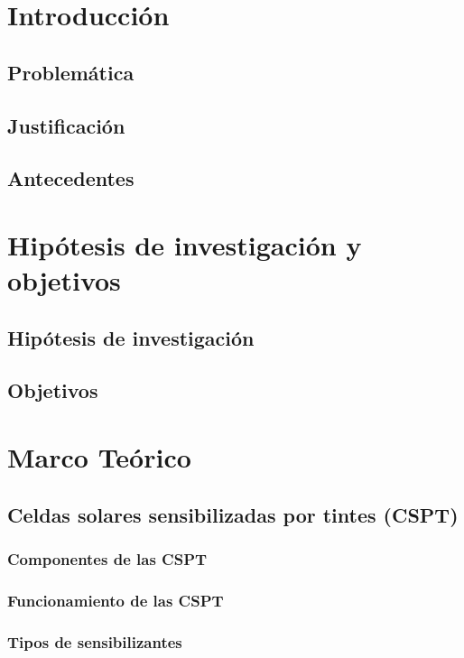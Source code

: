 \documentclass{article}
\theoremstyle{mytheoremstyle}
\theoremstyle{mytheoremstyle}
\theoremstyle{myproblemstyle}
\begin{document}
    \newpage
    \section{Introducción}
    \subsection{Problemática}
    
    \subsection{Justificación}
    
    \subsection{Antecedentes}
    
    \section{Hipótesis de investigación y objetivos}
    \subsection{Hipótesis de investigación}
    \subsection{Objetivos}
    \section{Marco Teórico}
    \subsection{Celdas solares sensibilizadas por tintes (CSPT)}

    \subsubsection{Componentes de las CSPT}
    \subsubsection{Funcionamiento de las CSPT}
    \subsubsection{Tipos de sensibilizantes}
\end{document}

